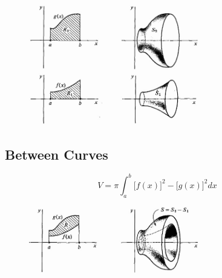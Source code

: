 \documentclass[a4paper,12pt]{article}
\begin{document}
\begin{figure}[H]
    \centering
    \includegraphics[width=0.66\textwidth]{rev1}
    \includegraphics[width=0.66\textwidth]{rev2}
\end{figure}


\subsection{Between Curves}
\Large
$$V = \pi\int^b_a{\Big[f(x)\Big]^2 - \Big[g(x)\Big]^2}dx$$
\normalsize

\begin{figure}[H]
    \centering
    \includegraphics[width=0.66\textwidth]{rev3}
\end{figure}
\end{document}
